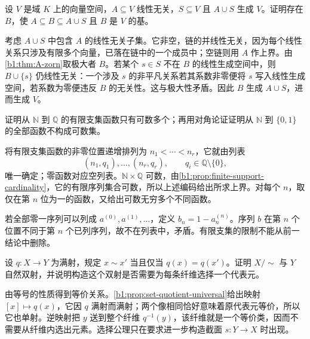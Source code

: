 \begin{exercise}\label{b1:ex:A-02}
	设 \(V\) 是域 \(K\) 上的向量空间，\(A\subseteq V\) 线性无关，\(S\subseteq V\) 且 \(A\cup S\) 生成 \(V\)。证明存在 \(B\)，使 \(A\subseteq B\subseteq A\cup S\) 且 \(B\) 是 \(V\) 的基。
\end{exercise}

\begin{solution}
	考虑 \(A\cup S\) 中包含 \(A\) 的线性无关子集。它非空，链的并线性无关，因为每个线性关系只涉及有限多个向量，已落在链中的一个成员中；空链则用 \(A\) 作上界。由\cref{b1:thm:A-zorn}取极大者 \(B\)。若某个 \(s\in S\) 不在 \(B\) 的线性生成空间中，则 \(B\cup\{s\}\) 仍线性无关：一个涉及 \(s\) 的非平凡关系若其系数非零便将 \(s\) 写入线性生成空间，若系数为零便违反 \(B\) 的无关性。这与极大性矛盾。因此 \(B\) 生成 \(A\cup S\)，进而生成 \(V\)。
\end{solution}

\begin{exercise}\label{b1:ex:A-03}
	证明从 \(\mathbb N\) 到 \(\mathbb Q\) 的有限支集函数只有可数多个；再用对角论证证明从 \(\mathbb N\) 到 \(\{0,1\}\) 的全部函数不构成可数集。
\end{exercise}

\begin{solution}
	将有限支集函数的非零位置递增排列为 \(n_1<\cdots<n_r\)，它就由列表
	\[
		(n_1,q_1),\ldots,(n_r,q_r),\qquad q_i\in\mathbb Q\setminus\{0\},
	\]
	唯一确定；零函数对应空列表。\(\mathbb N\times\mathbb Q\) 可数，由\cref{b1:prop:finite-support-cardinality}，它的有限序列集合可数，所以上述编码给出所求上界。对每个 \(n\)，取仅在第 \(n\) 位为一的函数，又给出可数无穷多个不同函数。

	若全部零一序列可以列成 \(a^{(0)},a^{(1)},\ldots\)，定义 \(b_n=1-a^{(n)}_n\)。序列 \(b\) 在第 \(n\) 个位置不同于第 \(n\) 个已列序列，故不在列表中，矛盾。有限支集的限制不能从前一结论中删除。
\end{solution}

\begin{exercise}\label{b1:ex:A-04}
	设 \(q:X\rightarrow Y\) 为满射，规定 \(x\sim x'\) 当且仅当 \(q(x)=q(x')\)。证明 \(X/{\sim}\) 与 \(Y\) 自然双射，并说明构造这个双射是否需要为每条纤维选择一个代表元。
\end{exercise}

\begin{solution}
	由等号的性质得到等价关系。\cref{b1:prop:set-quotient-universal}给出映射 \([x]\mapsto q(x)\)，它因 \(q\) 满射而满射；两个像相同恰好意味着原代表元等价，所以它也单射。逆映射把 \(y\) 送到整个纤维 \(q^{-1}(y)\)，该纤维就是一个等价类，因而不需要从纤维内选出元素。选择公理只在要求进一步构造截面 \(s:Y\rightarrow X\) 时出现。
\end{solution}

